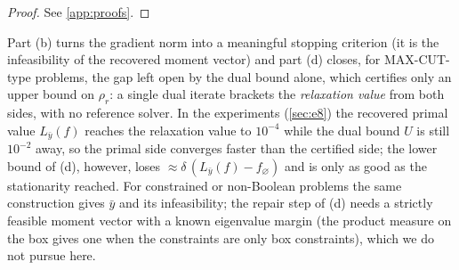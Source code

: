 \documentclass[a4paper,11pt]{article}
\theoremstyle{plain}
\theoremstyle{definition}
\theoremstyle{remark}
\begin{document}
\begin{proof}
See \cref{app:proofs}.
\end{proof}
\noindent Part (b) turns the gradient norm into a meaningful stopping criterion (it is the infeasibility of the recovered moment vector) and part (d) closes, for MAX-CUT-type problems, the gap left open by the dual bound alone, which certifies only an upper bound on $\rho_r$: a single dual iterate brackets the \emph{relaxation value} from both sides, with no reference solver. In the experiments (\cref{sec:e8}) the recovered primal value $L_{\bar y}(f)$ reaches the relaxation value to $10^{-4}$ while the dual bound $U$ is still $10^{-2}$ away, so the primal side converges faster than the certified side; the lower bound of (d), however, loses $\approx\delta\,(L_{\bar y}(f)-f_\varnothing)$ and is only as good as the stationarity reached. For constrained or non-Boolean problems the same construction gives $\bar y$ and its infeasibility; the repair step of (d) needs a strictly feasible moment vector with a known eigenvalue margin (the product measure on the box gives one when the constraints are only box constraints), which we do not pursue here.
\end{document}
